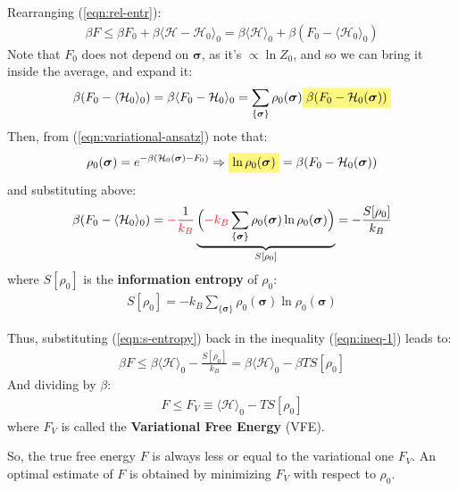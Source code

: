 \documentclass[../../main.tex]{subfiles}
\begin{document}
\medskip

Rearranging (\ref{eqn:rel-entr}):
\begin{align}\label{eqn:ineq-1}
    \beta F \leq \beta F_0 + \beta \langle \mathcal{H} - \mathcal{H}_0 \rangle_0 = \beta \langle \mathcal{H} \rangle_0 + \beta {(F_0 - \langle \mathcal{H}_0 \rangle_0)}
\end{align}
Note that $F_0$ does not depend on $\bm{\sigma}$, as it's $\propto \ln Z_0$, and so we can bring it inside the average, and expand it:
\begin{align*}
    \beta (F_0 - \langle \mathcal{H}_0 \rangle_0) = \beta \langle F_0 - \mathcal{H}_0 \rangle_0 =  \sum_{\{\bm{\sigma}\}} \rho_0(\bm{\sigma}) \hlc{Yellow}{\beta(F_0 - \mathcal{H}_0(\bm{\sigma}))}
\end{align*}
Then, from (\ref{eqn:variational-ansatz}) note that:
\begin{align*}
    \rho_0(\bm{\sigma}) = e^{-\beta (\mathcal{H}_0(\bm{\sigma}) - F_0)} \Rightarrow \hlc{Yellow}{\ln \rho_0(\bm{\sigma})} = \beta(F_0 - \mathcal{H}_0(\bm{\sigma}))
\end{align*}
and substituting above:
\begin{align}\label{eqn:s-entropy}
    \beta (F_0 - \langle \mathcal{H}_0 \rangle_0) =\textcolor{Red}{-}\frac{1}{\textcolor{Red}{k_B}}\underbrace{\Big( \textcolor{Red}{-k_B} \sum_{\{\bm{\sigma}\}} \rho_0(\bm{\sigma}) \ln \rho_0(\bm{\sigma})\Big)}_{S[\rho_0]}  = -\frac{S[\rho_0]}{k_B} 
\end{align}
where $S[\rho_0]$ is the \textbf{information entropy} of $\rho_0$:
\begin{align*}
    S[\rho_0] = -k_B \sum_{\{\bm{\sigma}\}} \rho_0(\bm{\sigma}) \ln \rho_0(\bm{\sigma})
\end{align*} 

Thus, substituting (\ref{eqn:s-entropy}) back in the inequality (\ref{eqn:ineq-1}) leads to:
\begin{align}\label{eqn:var-principle}
    \beta F \leq  \beta \langle \mathcal{H} \rangle_0 -\frac{S[\rho_0]}{k_B} = \beta \langle \mathcal{H} \rangle_0 - {\beta T S[\rho_0]}
\end{align}
And dividing by $\beta$:
\begin{align*}
    F \leq F_V \equiv \langle \mathcal{H} \rangle_0 - T S[\rho_0]
\end{align*}
where $F_V$ is called the \textbf{Variational Free Energy} (VFE). 

So,  the true free energy $F$ is always less or equal to the variational one $F_V$. An optimal estimate of $F$ is obtained by minimizing $F_V$ with respect to $\rho_0$.
\end{document}
